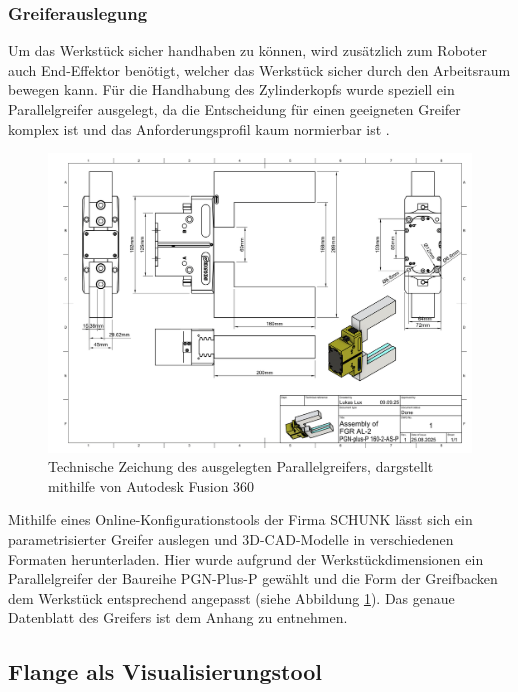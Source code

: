 \subsubsection{Greiferauslegung}

Um das Werkstück sicher handhaben zu können, wird zusätzlich zum Roboter auch
End-Effektor benötigt, welcher das Werkstück sicher durch den Arbeitsraum
bewegen kann. Für die Handhabung des Zylinderkopfs wurde speziell ein Parallelgreifer
ausgelegt, da die Entscheidung für einen geeigneten Greifer komplex ist und das
Anforderungsprofil kaum normierbar ist .\\


\begin{figure}[H]
	\centering
	\includegraphics[width=\linewidth]{Figures/SchunkGreifer-1.png}
	\caption{Technische Zeichung des ausgelegten Parallelgreifers, dargstellt
		mithilfe von Autodesk Fusion 360}
	\label{figure:schunkGripper}
\end{figure}

\noindent Mithilfe eines Online-Konfigurationstools der Firma
SCHUNK lässt sich ein parametrisierter Greifer auslegen und
3D-CAD-Modelle in verschiedenen Formaten herunterladen. Hier wurde aufgrund der
Werkstückdimensionen ein Parallelgreifer der Baureihe PGN-Plus-P gewählt und die
Form der Greifbacken dem Werkstück entsprechend angepasst (siehe Abbildung
\ref{figure:schunkGripper}).
Das genaue Datenblatt des Greifers ist dem Anhang zu entnehmen.

\subsection{Flange als Visualisierungstool}

